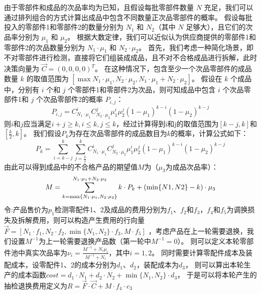 \documentclass[withoutpreface,bwprint]{cumcmthesis} %
\begin{document}
由于零部件和成品的次品率均为已知，且假设每批零部件数量 $N$ 充足，我们可以通过排列组合的方式计算出成品中包含不同数量正次品零部件的概率。
假设每批投入的零部件1和零部件2的数量分别为 $N_{1}$ 和 $N_{2}$（其中 $N$ 足够大），且它们的次品率分别为 $\mu_{1}$ 和 $\mu_{2}$。
根据大数定律，我们可以近似认为供应商提供的零部件1和零部件2的次品数量分别为 $N_{1}\cdot\mu_{1}$ 和 $N_{2}\cdot\mu_{2}$。
首先，我们考虑一种简化场景，即不对零部件进行检测，直接将它们组装成成品，且不对不合格成品进行拆解，此时决策向量为 $\vec{C}=(0,0,0,0)^{T}$。
在这种情况下，包含至少一个次品零部件的成品数量 $k$ 的取值范围为 $[\max {N_{1}\cdot\mu_{1},N_{2}\cdot\mu_{2} },N_{1}\cdot\mu_{1}+N_{2}\cdot\mu_{2}]$。
假设在 $k$ 个成品中，分别有 $i$ 个和 $j$ 个零部件1和零部件2为次品，则可知成品中包含 $i$ 个次品零部件1和 $j$ 个次品零部件2的概率 $P_{i,j}$：
\begin{equation}
	P_{i,j}=C_{N_{1}\cdot\mu_{1}}^{i}C_{N_{2}\cdot\mu_{2}}^{j}\mu_{1}^{i}\mu_{2}^{j}(1-\mu_{1})^{k-i}(1-\mu_{2})^{k-j}
	\label{eq:1}
\end{equation}
则$i$和$j$应当满足$i+j\ge k,i\le k,j\le k$，经过计算得到i和j的取值范围为$[k-j,k]$和$[\frac{k}{2},k]$。
我们假设$P_{k}$为存在次品零部件的成品数目为$k$的概率，计算公式如下：
\begin{equation}
	P_{k}=\sum_{i=k-j}^{k}\sum_{j=\frac{k}{2}}^{k}C_{N_{1}\cdot\mu_{1}}^{i}C_{N_{2}\cdot\mu_{2}}^{j}\mu_{1}^{i}\mu_{2}^{j}(1-\mu_{1})^{k-i}(1-\mu_{2})^{k-j}
	\label{eq:2}
\end{equation}
由此可以得到成品中的不合格产品的期望值$M$为（$\mu_{3}$为成品次品率）：
\begin{equation}
	M=\sum_{k=\max \{N_{1}\cdot\mu_{1},N_{2}\cdot\mu_{2} \}}^{N_{1}\cdot\mu_{1}+N_{2}\cdot\mu_{2}}k\cdot P_{k} + (\min \{ N1,N2\}-k)\cdot \mu_{3}\\
	\label{eq:3}
\end{equation}
令:产品售价为$p_{1}$检测零配件1、2及成品的费用分别为$f_{1}$、$f_{2}$和$f_{3}$，$f_{4}$和$f_{5}$为调换损失及拆解费用，则可以构造产生费用的行向量$\vec{F}=[N_{1}\cdot f_{1},N_{2}\cdot f_{2},\min \{N_{1},N_{2}\}\cdot f_{3},M\cdot f_{5}]$
，考虑产品在上一轮需要退换，我们设置$M^{-1}$为上一轮需要退换产品数（第一轮中$M^{-1}=0$）。
则可以定义本轮零部件池中真实次品率为$\nu_{i}=\frac{M^{-1}+N_{i}\mu_{i}}{M^{-1}+N_{i}}$，其中$i=1,2$。
同时需要计算零配件成本及装配成本，设零配件1、2的成本分别为$d_{1}$、$d_{2}$，装配成本为$d_{3}$，
则可以算出本轮生产的成本函数$cost=d_{1}\cdot N_{1}+d_{2}\cdot N_{2}+\min \{ N_{1},N_{2}\}\cdot d_{3}$，
于是可以将本轮产生的抽检退换费用定义为$R=\vec{F}\cdot\vec{C}+M\cdot f_{4}\cdot c_{3}$
\end{document}
